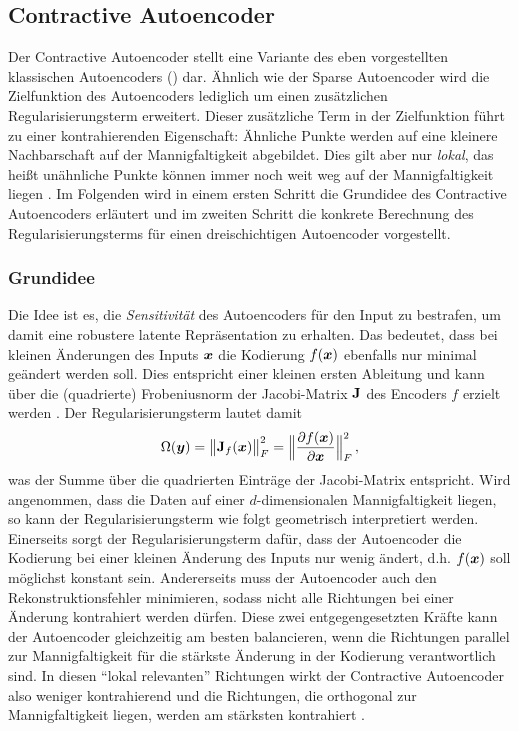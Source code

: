 \subsection{Contractive Autoencoder}
\label{ch:MethodenDerDimRed:ML:CAE}

Der Contractive Autoencoder \parencite{Rifai.2011a} stellt eine Variante des eben vorgestellten klassischen Autoencoders
() dar. Ähnlich wie der Sparse Autoencoder wird die
Zielfunktion des Autoencoders lediglich um einen zusätzlichen Regularisierungsterm erweitert.
Dieser zusätzliche Term in der Zielfunktion führt zu einer kontrahierenden Eigenschaft: Ähnliche
Punkte werden auf eine kleinere Nachbarschaft auf der Mannigfaltigkeit abgebildet. Dies gilt aber
nur \textit{lokal}, das heißt unähnliche Punkte können immer noch weit weg auf der Mannigfaltigkeit
liegen \parencite[521]{Goodfellow.2016}. Im Folgenden wird in einem ersten Schritt die Grundidee des
Contractive Autoencoders erläutert und im zweiten Schritt die konkrete Berechnung des
Regularisierungsterms für einen dreischichtigen Autoencoder vorgestellt.

\subsubsection{Grundidee}
\label{ch:MethodenDerDimRed:CAE:Grundidee}

Die Idee ist es, die \textit{Sensitivität} des Autoencoders für den Input zu bestrafen, um damit
eine robustere latente Repräsentation zu erhalten. Das bedeutet, dass bei kleinen Änderungen des
Inputs $\bm{x}$ die Kodierung $f(\bm{x})$ ebenfalls nur minimal geändert werden soll. Dies
entspricht einer kleinen ersten Ableitung und kann über die (quadrierte) Frobeniusnorm der
Jacobi-Matrix $\mathbf{J}$ des Encoders $f$ erzielt werden \parencites[2]{Rifai.2011a}[521]{Goodfellow.2016}. Der Regularisierungsterm lautet damit
\begin{equation}
	\label{eq:CAE-Regularisierung}
	\Omega(\vect{y}) = \norm[\big]{\mat{J}_f(\vect{x})}_F^2 =  \norm[\Big]{ \frac{\partial f(\vect{x})}{\partial \vect{x}} }^2_F \, ,
\end{equation}
was der Summe über die quadrierten Einträge der Jacobi-Matrix entspricht. Wird angenommen, dass die Daten auf einer $d$-dimensionalen Mannigfaltigkeit liegen, so kann der Regularisierungsterm wie folgt geometrisch interpretiert werden. Einerseits sorgt der Regularisierungsterm dafür, dass der Autoencoder die Kodierung bei einer kleinen Änderung des Inputs nur wenig ändert, d.h. $f(\bm{x})$ soll möglichst konstant sein. Andererseits muss der Autoencoder auch den Rekonstruktionsfehler minimieren, sodass nicht alle Richtungen bei einer Änderung kontrahiert werden dürfen. Diese zwei entgegengesetzten Kräfte kann der Autoencoder gleichzeitig am besten balancieren, wenn die Richtungen parallel zur Mannigfaltigkeit für die stärkste Änderung in der Kodierung verantwortlich sind. In diesen \enquote{lokal relevanten} Richtungen wirkt der Contractive Autoencoder also weniger kontrahierend und die Richtungen, die orthogonal zur Mannigfaltigkeit liegen, werden am stärksten kontrahiert \parencites[1]{Rifai.2011a}[649 -- 650]{Rifai.2011b}.

